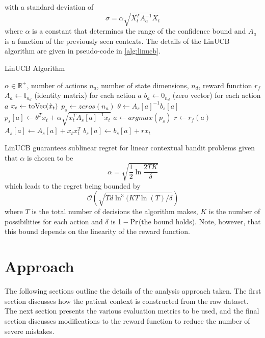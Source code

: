 \documentclass{article}
\begin{document}
with a standard deviation of 
\begin{equation}
    \sigma = \alpha \sqrt{X_t^T A_a^{-1} X_t}
\end{equation}
where $\alpha$ is a constant that determines the range of the confidence bound and $A_a$ is a function of the previously seen contexts. The details of the LinUCB algorithm are given in pseudo-code in \cref{alg:linucb}.

\begin{algorithm}[tb]
   \caption{LinUCB Algorithm}
   \label{alg:linucb}
\begin{algorithmic}
    $\alpha \in \mathbb{R}^+$, number of actions $n_a$, number of state dimensions, $n_d$, reward function $r_f$
   \STATE $A_a \gets \mathbb{I}_{n_d}$ (identity matrix) for each action $a$ 
    \STATE $b_a \gets 0_{n_d}$ (zero vector) for each action $a$ 
   \STATE $x_t \gets {\rm toVec}(\hat{x}_t)$
   \STATE $p_s \gets zeros(n_a)$
   \STATE $\theta \gets A_s[a]^{-1} b_s[a]$
   \STATE $p_s[a] \gets \theta^T x_t + \alpha \sqrt{x_t^T A_s[a]^{-1} x_t}$
   \ENDFOR
   \STATE $a \gets arg max(p_s)$
   \STATE $r \gets r_f(a)$
   \STATE $A_s[a] \gets A_s[a] + x_t x_t^T$
   \STATE $b_s[a] \gets b_s[a] + r x_t$
   \ENDFOR
\end{algorithmic}
\end{algorithm}

LinUCB guarantees sublinear regret for linear contextual bandit problems given that $\alpha$ is chosen to be \cite{chu2011contextual}
\begin{equation}
    \alpha = \sqrt{\frac{1}{2} \ln \frac{2 T K}{\delta}}
\end{equation}
which leads to the regret being bounded by 
\begin{equation}
    \mathcal{O}\left( \sqrt{T d \ln^3(K T \ln(T)/\delta} \right)
\end{equation}
where $T$ is the total number of decisions the algorithm makes, $K$ is the number of possibilities for each action and $\delta$ is $1 - {\rm Pr}$(the bound holds). Note, however, that this bound depends on the linearity of the reward function.


\section{Approach}
\label{approach}

The following sections outline the details of the analysis approach taken. The first section discusses how the patient context is constructed from the raw dataset. The next section presents the various evaluation metrics to be used, and the final section discusses modifications to the reward function to reduce the number of severe mistakes. 
\end{document}
